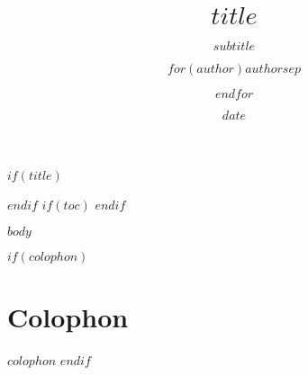 \documentclass[11pt,oneside]{scrbook}
\title{\sffamily\bfseries\Huge $title$}
\subtitle{\sffamily\Large\color{black!60} $subtitle$}
\author{\sffamily\large $for(author)$$author$$sep$ \and $endfor$}
\date{\sffamily $date$}
\date{}
\begin{document}
$if(title)$
  \maketitle
$endif$
$if(toc)$
  \tableofcontents
  \cleardoublepage
$endif$

$body$

\backmatter
$if(colophon)$
  \chapter*{Colophon}
  $colophon$
$endif$
\end{document}
